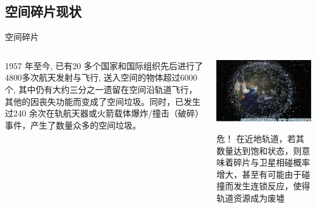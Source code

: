 \documentclass[sectioncirclenumberstyle]{le2iutbmbeamer}
\begin{document}
\subsection{空间碎片现状}
\begin{frame}{空间碎片}
\begin{columns}
	\begin{column}{.48\linewidth}
		1957 年至今, 已有20 多个国家和国际组织先后进行了4800多次航天发射与飞行, 送入空间的物体超过6000个, 其中仍有大约三分之一遗留在空间沿轨道飞行，其他的因丧失功能而变成了空间垃圾。同时，已发生过240 余次在轨航天器或火箭载体爆炸/撞击（破碎）事件，产生了数量众多的空间垃圾。
	\end{column}
	\begin{column}{.5\linewidth}
		\includegraphics[width=\linewidth]{figures/debristatus}
		\begin{alertblock}{危！}
			在近地轨道，若其数量达到饱和状态，则意味着碎片与卫星相碰概率增大，甚至有可能由于碰撞而发生连锁反应，使得轨道资源成为废墟
		\end{alertblock}
	\end{column}
\end{columns}
\end{frame}
\end{document}
